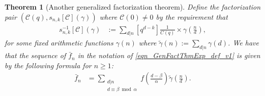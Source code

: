 \documentclass[12pt,reqno,a4letter]{article}
\numberwithin{figure}{section}
\numberwithin{table}{section}
\numberwithin{equation}{section}
\theoremstyle{plain}
\newtheorem{theorem}{Theorem}
\numberwithin{theorem}{section}
\theoremstyle{definition}
\begin{document}
\begin{theorem}[Another generalized factorization theorem] 
\label{theorem2_AnotherGenFactThm}
Define the factorization pair $(\mathcal{C}(q), s_{n,k}[\mathcal{C}](\gamma))$ where 
$\mathcal{C}(0) \neq 0$ by the requirement that 
\begin{align*}
     s_{n,k}^{-1}[\mathcal{C}](\gamma) & := \sum_{d|n} [q^{d-k}] \frac{1}{C(q)} \times \gamma\left(\frac{n}{d}\right), 
\end{align*} 
for some fixed arithmetic functions $\gamma(n)$ where $\widetilde{\gamma}(n) := \sum_{d|n} \gamma(d)$. 
We have that the sequence of 
$\bar{f}_n$ in the notation of \eqref{eqn_GenFactThmExp_def_v1} 
is given by the following formula for $n \geq 1$: 
\begin{align*} 
\bar{f}_n & = 
     \sum_{\substack{d|n \\ d \equiv \beta \bmod \alpha}} f\left({\frac{d-\beta}{\alpha}}\right) 
     \widetilde{\gamma}\left(\frac{n}{d}\right). 
\end{align*} 
\end{theorem} 
\end{document}
